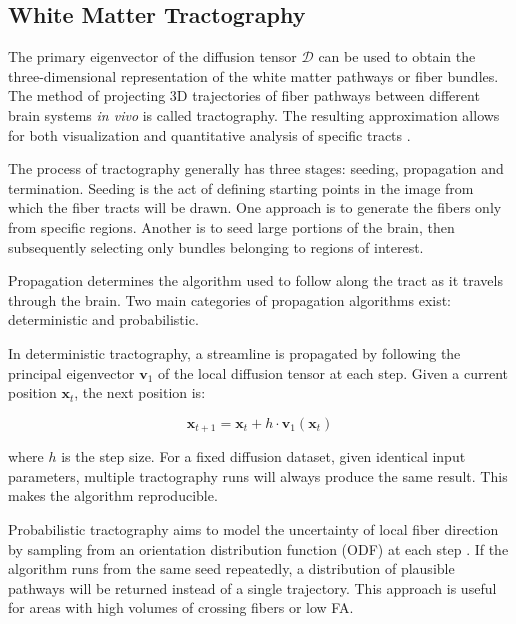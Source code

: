 \clearpage

\subsection{White Matter Tractography}
\label{subsec:background_tractography}

The primary eigenvector of the diffusion tensor $\mathcal{D}$ can be used to obtain the three-dimensional representation of the white matter pathways or fiber bundles. The method of projecting 3D trajectories of fiber pathways between different brain systems \textit{in vivo} is called tractography. The resulting approximation allows for both visualization and quantitative analysis of specific tracts \cite{soares_hitchhikers_2013}.

The process of tractography generally has three stages: seeding, propagation and termination. Seeding is the act of defining starting points in the image from which the fiber tracts will be drawn. One approach is to generate the fibers only from specific regions. Another is to seed large portions of the brain, then subsequently selecting only bundles belonging to regions of interest.

Propagation determines the algorithm used to follow along the tract as it travels through the brain. Two main categories of propagation algorithms exist: deterministic and probabilistic. 

In deterministic tractography, a streamline is propagated by following the principal eigenvector $\mathbf{v}_1$ of the local diffusion tensor at each step. Given a current position $\mathbf{x}_t$, the next position is:

\begin{equation}
	\mathbf{x}_{t+1} = \mathbf{x}_t + h \cdot \mathbf{v}_1(\mathbf{x}_t)
	\label{eq:det_step}
\end{equation}

where $h$ is the step size. For a fixed diffusion dataset, given identical input parameters, multiple tractography runs will always produce the same result. This makes the algorithm reproducible.

Probabilistic tractography aims to model the uncertainty of local fiber direction by sampling from an orientation distribution function (ODF) at each step \cite{lazar_mapping_2010}. If the algorithm runs from the same seed repeatedly, a distribution of plausible pathways will be returned instead of a single trajectory. This approach is useful for areas with high volumes of crossing fibers or low FA.

